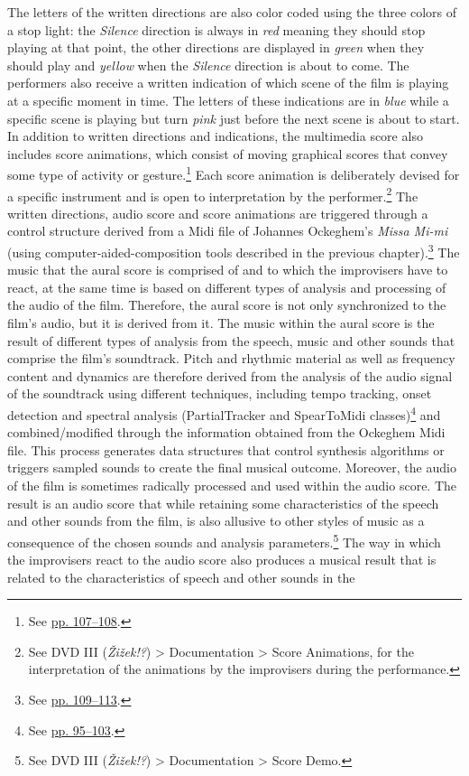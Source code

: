 The letters of the written directions are also color coded using the three colors of a stop light: the \emph{Silence} direction is always in \emph{red} meaning they should stop playing at that point, the other directions are displayed in \emph{green} when they should play and \emph{yellow} when the \emph{Silence} direction is about to come. The performers also receive a written indication of which scene of the film is playing at a specific moment in time. The letters of these indications are in \emph{blue} while a specific scene is playing but turn \emph{pink} just before the next scene is about to start. In addition to written directions and indications, the multimedia score also includes score animations, which consist of moving graphical scores that convey some type of activity or gesture.\footnote{See \hyperlink{algoanimation}{pp. 107--108}.} Each score animation is deliberately devised for a specific instrument and is open to interpretation by the performer.\footnote{See DVD III (\emph{\v{Z}i\v{z}ek!?}) \tiny \textgreater \footnotesize \hspace{0pt} Documentation \tiny \textgreater \footnotesize \hspace{0pt} Score Animations, for the interpretation of the animations by the improvisers during the performance.} The written directions, audio score and score animations are triggered through a control structure derived from a Midi file of Johannes Ockeghem's \emph{Missa Mi-mi} (using computer-aided-composition tools described in the previous chapter).\footnote{See \hyperlink{compueraided}{pp. 109--113}.} The music that the aural score is comprised of and to which the improvisers have to react, at the same time is based on different types of analysis and processing of the audio of the film. Therefore, the aural score is not only synchronized to the film's audio, but it is derived from it. The music within the aural score is the result of different types of analysis from the speech, music and other sounds that comprise the film's soundtrack. Pitch and rhythmic material as well as frequency content and dynamics are therefore derived from the analysis of the audio signal of the soundtrack using different techniques, including tempo tracking, onset detection and spectral analysis (PartialTracker and SpearToMidi classes)\footnote{See \hyperlink{spectrack}{pp. 95--103}.} and combined/modified through the information obtained from the Ockeghem Midi file. This process generates data structures that control synthesis algorithms or triggers sampled sounds to create the final musical outcome. Moreover, the audio of the film is sometimes radically processed and used within the audio score. The result is an audio score that while retaining some characteristics of the speech and other sounds from the film, is also allusive to other styles of music as a consequence of the chosen sounds and analysis parameters.\footnote{See DVD III (\emph{\v{Z}i\v{z}ek!?}) \tiny \textgreater \footnotesize \hspace{0pt} Documentation \tiny \textgreater \footnotesize \hspace{0pt} Score Demo.} The way in which the improvisers react to the audio score also produces a musical result that is related to the characteristics of speech and other sounds in the 
